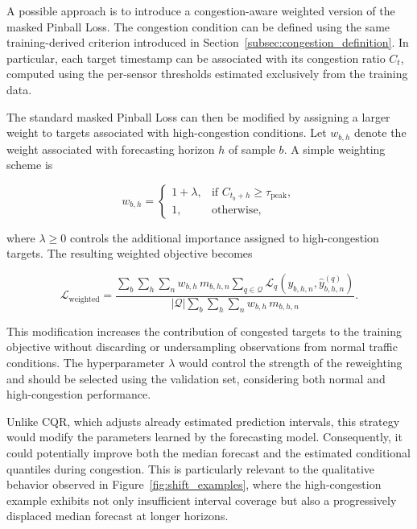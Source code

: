 A possible approach is to introduce a congestion-aware weighted version of
the masked Pinball Loss. The congestion condition can be defined using the
same training-derived criterion introduced in
Section~\ref{subsec:congestion_definition}. In particular, each target
timestamp can be associated with its congestion ratio $C_t$, computed using
the per-sensor thresholds estimated exclusively from the training data.

The standard masked Pinball Loss can then be modified by assigning a larger
weight to targets associated with high-congestion conditions. Let
$w_{b,h}$ denote the weight associated with forecasting horizon $h$ of sample
$b$. A simple weighting scheme is

\begin{equation}
    w_{b,h} =
    \begin{cases}
        1 + \lambda, & \text{if } C_{t_b+h} \geq \tau_{\mathrm{peak}}, \\
        1,           & \text{otherwise},
    \end{cases}
    \label{eq:congestion_weight}
\end{equation}

where $\lambda \geq 0$ controls the additional importance assigned to
high-congestion targets. The resulting weighted objective becomes

\begin{equation}
    \mathcal{L}_{\mathrm{weighted}}
    =
    \frac{
        \displaystyle
        \sum_b \sum_h \sum_n
        w_{b,h}\,m_{b,h,n}
        \sum_{q \in \mathcal{Q}}
        \mathcal{L}_q
        \left(
            y_{b,h,n},
            \hat{y}^{(q)}_{b,h,n}
        \right)
    }{
        \displaystyle
        |\mathcal{Q}|
        \sum_b \sum_h \sum_n
        w_{b,h}\,m_{b,h,n}
    }.
    \label{eq:weighted_pinball}
\end{equation}

This modification increases the contribution of congested targets to the
training objective without discarding or undersampling observations from
normal traffic conditions. The hyperparameter $\lambda$ would control the
strength of the reweighting and should be selected using the validation set,
considering both normal and high-congestion performance.

Unlike CQR, which adjusts already estimated prediction intervals, this
strategy would modify the parameters learned by the forecasting model.
Consequently, it could potentially improve both the median forecast and the
estimated conditional quantiles during congestion. This is particularly
relevant to the qualitative behavior observed in
Figure~\ref{fig:shift_examples}, where the high-congestion example exhibits
not only insufficient interval coverage but also a progressively displaced
median forecast at longer horizons.

